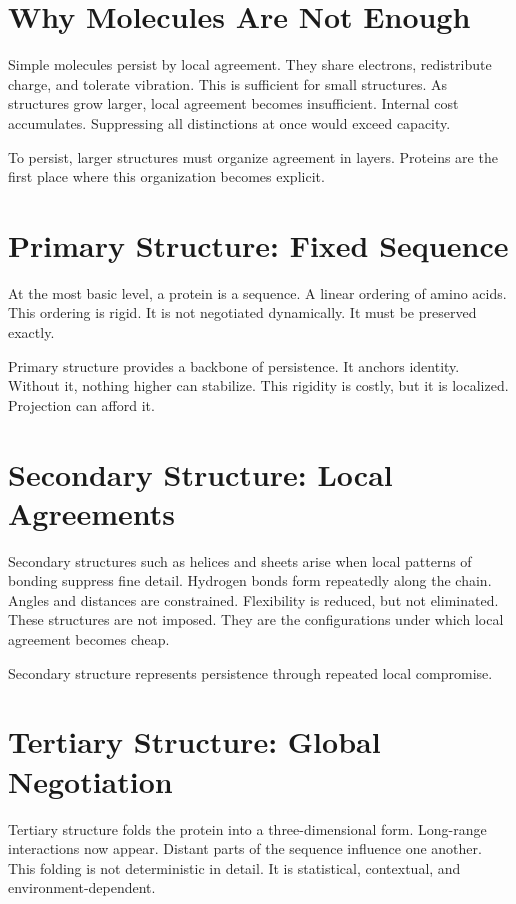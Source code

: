 \documentclass[11pt,twoside,openright]{book}
\begin{document}
\section*{Why Molecules Are Not Enough}

Simple molecules persist by local agreement. They share electrons, redistribute charge, and tolerate vibration. This is sufficient for small structures. As structures grow larger, local agreement becomes insufficient. Internal cost accumulates. Suppressing all distinctions at once would exceed capacity.

To persist, larger structures must organize agreement in layers. Proteins are the first place where this organization becomes explicit.

\section*{Primary Structure: Fixed Sequence}

At the most basic level, a protein is a sequence. A linear ordering of amino acids. This ordering is rigid. It is not negotiated dynamically. It must be preserved exactly.

Primary structure provides a backbone of persistence. It anchors identity. Without it, nothing higher can stabilize. This rigidity is costly, but it is localized. Projection can afford it.

\section*{Secondary Structure: Local Agreements}

Secondary structures such as helices and sheets arise when local patterns of bonding suppress fine detail. Hydrogen bonds form repeatedly along the chain. Angles and distances are constrained. Flexibility is reduced, but not eliminated. These structures are not imposed. They are the configurations under which local agreement becomes cheap.

Secondary structure represents persistence through repeated local compromise.

\section*{Tertiary Structure: Global Negotiation}

Tertiary structure folds the protein into a three-dimensional form. Long-range interactions now appear. Distant parts of the sequence influence one another. This folding is not deterministic in detail. It is statistical, contextual, and environment-dependent.
\end{document}

